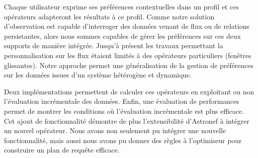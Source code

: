 Chaque utilisateur exprime ses préférences contextuelles dans un profil et ces opérateurs adapteront les résultats à ce profil. Comme notre solution d'observation est capable d'interroger des données venant de flux ou de relations persistantes, alors nous sommes capables de gérer les préférences sur ces deux supports de manière intégrée. Jusqu'à présent les travaux permettant la personnalisation sur les flux étaient limités à des opérateurs particuliers (fenêtres glissantes). Notre approche permet une généralisation de la gestion de préférences sur les données issues d'un système hétérogène et dynamique.

Deux implémentations permettent de calculer ces opérateurs en exploitant ou non l'évaluation incrémentale des données. Enfin, une évaluation de performances permet de montrer les conditions où l'évaluation incrémentale est plus efficace. Cet ajout de fonctionnalité démontre de plus l'extensibilité d'Astronef à intégrer un nouvel opérateur. Nous avons non seulement pu intégrer une nouvelle fonctionnalité, mais aussi nous avons pu donner des règles à l'optimiseur pour construire un plan de requête efficace.

